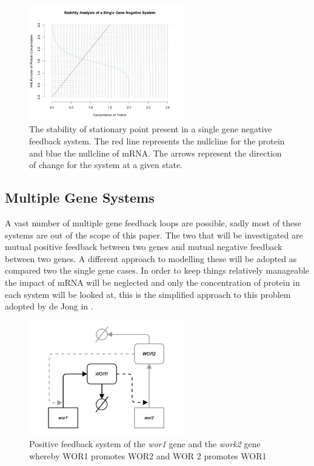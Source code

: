 \documentclass[]{article}
\begin{document}
            \begin{figure}[h]
            \centering
            \includegraphics[width=0.6\textwidth]{./figures/stabilitySingleNegative.jpeg}
            \caption{The stability of stationary point present in a single gene negative feedback system. The red line represents the nullcline for the protein and blue the nullcline of mRNA. The arrows represent the direction of change for the system at a given state.}
            \label{stabilitySingleNegative}
            \end{figure}
            
\pagebreak
        \subsection{Multiple Gene Systems}
        A vast number of multiple gene feedback loops are possible, sadly most of these systems are out of the scope of this paper. %
        The two that will be investigated are mutual positive feedback between two genes and mutual negative feedback between two genes. A different approach to modelling these will be adopted as compared two the single gene cases. In order to keep things relatively manageable the impact of mRNA will be neglected and only the concentration of protein in each system will be looked at, this is the simplified approach to this problem adopted by de Jong in \cite{multiGene}. 

        \begin{figure}[h]
        \centering
        \includegraphics[width=0.6\textwidth]{./figures/doublePositive.png}
        \caption{Positive feedback system of the \textit{wor1} gene and the \textit{work2} gene whereby WOR1 promotes WOR2 and WOR 2 promotes WOR1}
        \label{doublePositive}
        \end{figure}            
    
\end{document}
